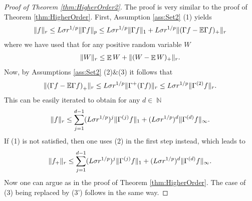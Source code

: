 \documentclass[10pt,a4paper]{amsart}
\DeclareMathOperator	{\IE}		{\mathbb{E}}
\DeclareMathOperator	{\IN}		{\mathbb{N}}
\DeclarePairedDelimiter	{\norm}		{\lVert}	{\rVert}
\def\E{{\mathbb E}}
\begin{document}
\begin{proof}[Proof of Theorem \ref{thm:HigherOrder2}]
	The proof is very similar to the proof of Theorem \ref{thm:HigherOrder}. First, Assumption \ref{ass:Set2} (1) yields
	\begin{align*}
		\norm{f}_r \le L\sigma r^{1/p} \norm{\Gamma f}_p \le L\sigma r^{1/p} \norm{\Gamma f}_1 + L\sigma r^{1/p} \norm{(\Gamma f - \E \Gamma f)_+}_r
	\end{align*}
	where we have used that for any positive random variable $W$
	\begin{align}		\label{eqn:LpEstimatePositiveFunction}
		\norm{W}_r \le \IE W + \norm{(W - \IE W)_+}_r.
	\end{align}
	Now, by Assumptions \ref{ass:Set2} (2)\&(3) it follows that
	\begin{align*}
		\norm{\left( \Gamma f - \E \Gamma f \right)_+}_r \le L\sigma r^{1/p} \norm{\Gamma^+ (\Gamma f)}_r \le L\sigma r^{1/p} \norm{\Gamma^{(2)}f}_r.
	\end{align*}
	This can be easily iterated to obtain for any $d \in \IN$
	\begin{align*}
		\norm{f}_r \le \sum_{j = 1}^{d-1} (L\sigma r^{1/p})^j \norm{\Gamma^{(j)}f}_1 + (L\sigma r^{1/p})^d \norm{\Gamma^{(d)}f}_\infty.
	\end{align*}
	If (1) is not satisfied, then one uses (2) in the first step instead, which leads to
	\begin{align*}
		\norm{f_+}_r \le \sum_{j = 1}^{d-1} (L\sigma r^{1/p})^j \norm{\Gamma^{(j)}f}_1 + (L\sigma r^{1/p})^d \norm{\Gamma^{(d)}f}_\infty.
	\end{align*}
	Now one can argue as in the proof of Theorem \ref{thm:HigherOrder}. The case of (3) being replaced by (3') follows in the same way.
\end{proof}
\end{document}
